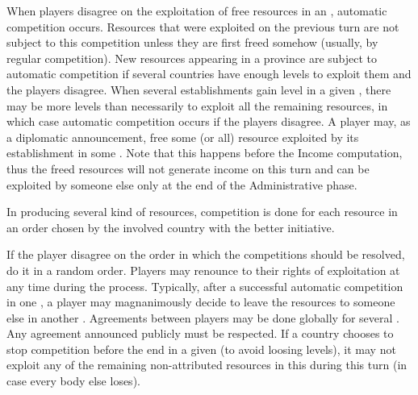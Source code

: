  When players disagree on the exploitation of
free resources in an \Area, automatic competition occurs.
\bparag Resources that were exploited on the previous turn are not subject to
this competition unless they are first freed somehow (usually, by regular
competition).
\bparag New resources appearing in a province are subject to automatic
competition if several countries have enough levels to exploit them and the
players disagree.
\bparag When several establishments gain level in a given \Area, there may be
more levels than necessarily to exploit all the remaining resources, in which
case automatic competition occurs if the players disagree.
\bparag A player may, as a diplomatic announcement, free some (or all)
resource exploited by its establishment in some \Area. Note that this happens
before the Income computation, thus the freed resources will not generate
income on this turn and can be exploited by someone else only at the end of
the Administrative phase.

 In \Area producing several kind of
resources, competition is done for each resource in an order chosen by the
involved country with the better initiative.

 If the player disagree on the order in which
the competitions should be resolved, do it in a random order.
\bparag Players may renounce to their rights of exploitation at any time
during the process. Typically, after a successful automatic competition in one
\Area, a player may magnanimously decide to leave the resources to someone
else in another \Area.
\bparag Agreements between players may be done globally for several \Area. Any
agreement announced publicly must be respected.
\bparag If a country chooses to stop competition before the end in a given
\Area (to avoid loosing levels), it may not exploit any of the remaining
non-attributed resources in this \Area during this turn (in case every body
else loses).

